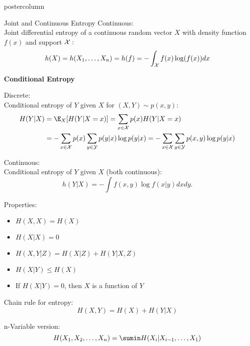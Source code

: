 \documentclass{beamer}
\begin{document}
\begin{frame}[fragile]{}
\begin{columns}
\begin{column}{.31\textwidth}
\begin{beamercolorbox}[center]{postercolumn}
\begin{minipage}{.98\textwidth}
{\begin{myblock}{Joint and Continuous Entropy}
                Continuous:\\
              Joint differential entropy of a continuous random vector $X$ with density function $f(x)$ and support $\mathcal{X}:$
									$$ h(X) = h(X_1, \ldots, X_n) = h(f) = - \int_{\mathcal{X}} f(x) \log(f(x)) dx $$
								

                  \begin{codebox}
                  \textbf{Conditional Entropy}
                \end{codebox}

                Discrete:\\
							Conditional entropy of $Y$  given $X$ for $(X, Y) \sim p(x, y):$
								{\small 
									\begin{equation*}
										\begin{aligned}
											H(Y | X) &= \E_X[H(Y|X=x)] = \sum_{x \in \Xspace} p(x) H(Y | X=x) \\
											&=-\sum_{x \in \Xspace} p(x) \sum_{y \in \Yspace} p(y | x) \log p(y | x) 
											=-\sum_{x \in \Xspace} \sum_{y \in \Yspace} p(x, y) \log p(y | x)  
										\end{aligned}
									\end{equation*}
								}  


                Continuous:\\
							Conditional entropy of $Y$ given $X$ (both continuous):
								$$h(Y|X) = - \int f(x,y) \log f(x|y) dx dy.$$

                Properties:
								\begin{itemize}[$\bullet$]
									\setlength{\itemindent}{+.3in}
										\item $H(X, X)       = H(X)  $
										\item $H(X | X)      = 0 $
										\item $H(X, Y | Z)   =H(X | Z)+H(Y | X, Z)$
										\item $H(X | Y) \leq H(X) $
										\item  If $H(X|Y) = 0$, then $X$ is a function of $Y$
								\end{itemize}

                Chain rule for entropy:
								$$H(X, Y)=H(X)+H(Y | X)$$
					
								n-Variable version:
								$$H(X_{1}, X_{2}, \ldots, X_{n})=\sumin H(X_{i} | X_{i-1}, \ldots, X_{1})$$
								

                \end{myblock}

}
\end{minipage}
\end{beamercolorbox}
\end{column}
\end{columns}
\end{frame}
\end{document}
